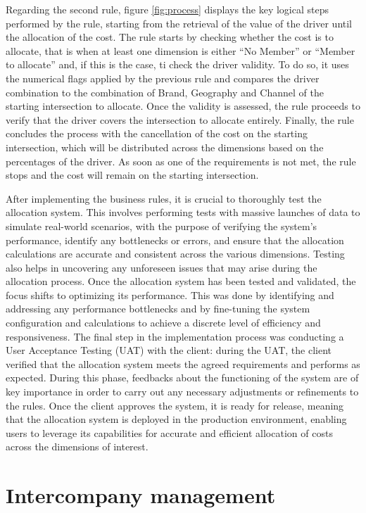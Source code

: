 \documentclass[12pt,a4paper,openright,twoside]{book}
\begin{document}
Regarding the second rule, figure \ref{fig:process} displays the key logical steps performed by the rule, starting from the retrieval of the value of the driver until the allocation of the cost.
%
The rule starts by checking whether the cost is to allocate, that is when at least one dimension is either ``No Member'' or ``Member to allocate'' and, if this is the case, ti check the driver validity.
%
To do so, it uses the numerical flags applied by the previous rule and compares the driver combination to the combination of Brand, Geography and Channel of the starting intersection to allocate.
%
Once the validity is assessed, the rule proceeds to verify that the driver covers the intersection to allocate entirely.
%
Finally, the rule concludes the process with the cancellation of the cost on the starting intersection, which will be distributed across the dimensions based on the percentages of the driver.
%
As soon as one of the requirements is not met, the rule stops and the cost will remain on the starting intersection.

After implementing the business rules, it is crucial to thoroughly test the allocation system.
%
This involves performing tests with massive launches of data to simulate real-world scenarios, with the purpose of verifying the system's performance, identify any bottlenecks or errors, and ensure that the allocation calculations are accurate and consistent across the various dimensions. 
%
Testing also helps in uncovering any unforeseen issues that may arise during the allocation process.
%
Once the allocation system has been tested and validated, the focus shifts to optimizing its performance. 
%
This was done by identifying and addressing any performance bottlenecks and by fine-tuning the system configuration and calculations to achieve a discrete level of efficiency and responsiveness. 
%
The final step in the implementation process was conducting a User Acceptance Testing (UAT) with the client: during the UAT, the client verified that the allocation system meets the agreed requirements and performs as expected. 
%
During this phase, feedbacks about the functioning of the system are of key importance in order to carry out any necessary adjustments or refinements to the rules.
%
Once the client approves the system, it is ready for release, meaning that the allocation system is deployed in the production environment, enabling users to leverage its capabilities for accurate and efficient allocation of costs across the dimensions of interest.

\section{Intercompany management}
\end{document}
